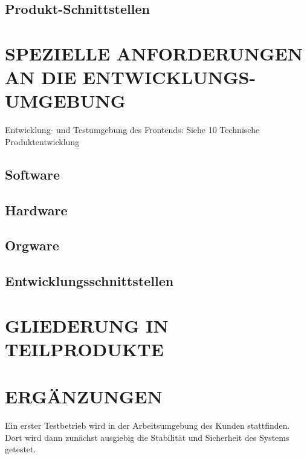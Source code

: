	\subsection{Produkt-Schnittstellen}
	
	
	\section{\Large SPEZIELLE ANFORDERUNGEN AN DIE ENTWICKLUNGS-UMGEBUNG}
	Entwicklung- und Testumgebung des Frontends: Siehe 10 Technische Produktentwicklung 
	\subsection{Software}
	\subsection{Hardware}
	\subsection{Orgware}
	\subsection{Entwicklungsschnittstellen}
	
	
	\section{\Large GLIEDERUNG IN TEILPRODUKTE}
	
	
	\section{\Large ERGÄNZUNGEN}
	Ein erster Testbetrieb wird in der Arbeitsumgebung des Kunden stattfinden. Dort wird dann zunächst ausgiebig die Stabilität und Sicherheit des Systems getestet.
	
\newpage
